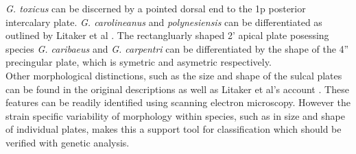 \documentclass[12pt]{article}
\begin{document}
\emph{G. toxicus} can be discerned by a pointed dorsal end to the 1p posterior intercalary plate. \emph{G. carolineanus} and \emph{polynesiensis} can be differentiated as outlined by Litaker et al \cite{litaker2009taxonomy}. The rectangluarly shaped 2' apical plate posessing species \emph{G. caribaeus} and \emph{G. carpentri} can be differentiated by the shape of the 4'' precingular plate, which is symetric and asymetric respectively. \\
Other morphological distinctions, such as the size and shape of the sulcal plates can be found in the original descriptions as well as Litaker et al's account \cite{litaker2009taxonomy,fraga2011gambierdiscus,faust1995observation,holmes1998gambierdiscus,chinain1999morphology}. %
These features can be readily identified using scanning electron microscopy. However the strain specific variability of morphology within species, such as in size and shape of individual plates, makes this a support tool for classification which should be verified with genetic analysis. \\
\end{document}
